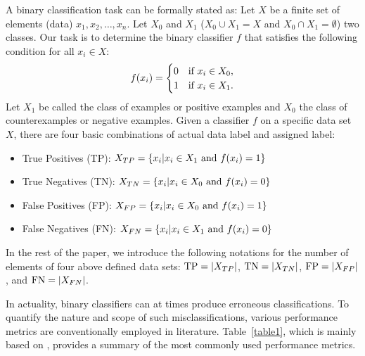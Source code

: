 \documentclass[3p,times]{elsarticle}
\begin{document}
A binary classification task can be formally stated as: Let $X$ be a finite set of elements (data) $x_1,x_2,\dots,x_n$. Let $X_0$ and $X_1$ ($X_0\cup X_1=X$ and $X_0\cap X_1=\emptyset$) two classes. Our task is to determine the binary classifier $f$ that satisfies the following condition for all $x_i\in X$: 
\begin{equation}
f(x_i) = \begin{cases}
  0 &\hbox{if } x_i\in X_0, \\
  1 &\hbox{if } x_i\in X_1.
\end{cases}    
\end{equation}
Let $X_1$ be called the class of examples or positive examples and $X_0$ the class of counterexamples or negative examples. 
Given a classifier $f$ on a specific data set $X$, there are four basic combinations of actual data label and assigned label: 
\begin{itemize}
    \item True Positives (TP):  $X_{TP}=\{x_i\vert x_i\in X_1\hbox{ and }f(x_i)=1\}$
    \item True Negatives (TN):  $X_{TN}=\{x_i\vert x_i\in X_0\hbox{ and }f(x_i)=0\}$
    \item False Positives (FP): $X_{FP}=\{x_i\vert x_i\in X_0\hbox{ and }f(x_i)=1\}$
    \item False Negatives (FN): $X_{FN}=\{x_i\vert x_i\in X_1\hbox{ and }f(x_i)=0\}$
\end{itemize}
 
In the rest of the paper, we introduce the following notations for the number of elements of four above defined data sets: $\hbox{TP}=\vert X_{TP}\vert$, $\hbox{TN}=\vert X_{TN}\vert$, $\hbox{FP}=\vert X_{FP}\vert$, and $\hbox{FN}=\vert X_{FN}\vert$.

In actuality, binary classifiers can at times produce erroneous classifications. To quantify the nature and scope of such misclassifications, various performance metrics are conventionally employed in literature. Table~\ref{table1}, which is mainly based on \cite{9}, provides a summary of the most commonly used performance metrics.
\end{document}

